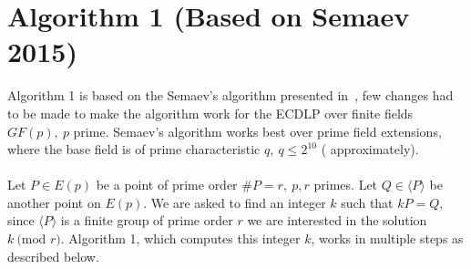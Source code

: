 \documentclass[thesis=M,english]{FITthesis}[2012/10/20]
\theoremstyle{remark}
\theoremstyle{definition}
\begin{document}
\section{Algorithm 1 (Based on Semaev 2015)} \label{alg1}
Algorithm 1 is based on the Semaev's algorithm presented in~\cite{semaev15}, few changes had to be made to make the algorithm work for the ECDLP over finite fields $GF(p),\ p$ prime. Semaev's algorithm works best over prime field extensions, where the base field is of prime characteristic $q,\ q \leq 2^{10}$ ( approximately).  \\ \\
\noindent Let $P \in E(p)$ be a point of prime order $\#P = r,\ p,r$ primes. Let $Q \in \langle P \rangle$ be another point on $E(p)$. We are asked to find an integer $k$ such that $kP = Q,$ since $\langle P \rangle$ is a finite group of prime order $r$ we are interested in the solution $k\ \text{(mod }r)$. Algorithm 1, which computes this integer $k$, works in multiple steps as described below.
\end{document}
